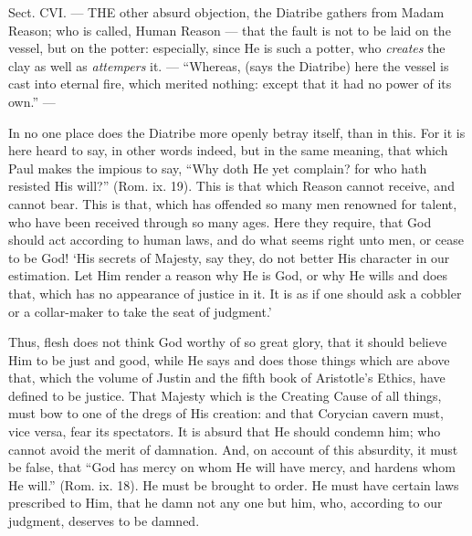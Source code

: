 
Sect. CVI. — THE other absurd objection, the Diatribe gathers from Madam Reason; who is called, Human Reason — that the fault is not to be laid on the vessel, but on the potter: especially, since He is such a potter, who \emph{creates }the clay as well as \emph{attempers }it. — “Whereas, (says the Diatribe) here the vessel is cast into eternal fire, which merited nothing: except that it had no power of its own.” —

In no one place does the Diatribe more openly betray itself, than in this. For it is here heard to say, in other words indeed, but in the same meaning, that which Paul makes the impious to say, “Why doth He yet complain? for who hath resisted His will?” (Rom. ix. 19). This is that which Reason cannot receive, and cannot bear. This is that, which has offended so many men renowned for talent, who have been received through so many ages. Here they require, that God should act according to human laws, and do what seems right unto men, or cease to be God! ‘His secrets of Majesty, say they, do not better His character in our estimation. Let Him render a reason why He is God, or why He wills and does that, which has no appearance of justice in it. It is as if one should ask a cobbler or a collar-maker to take the seat of judgment.’

Thus, flesh does not think God worthy of so great glory, that it should believe Him to be just and good, while He says and does those things which are above that, which the volume of Justin and the fifth book of Aristotle’s Ethics, have defined to be justice. That Majesty which is the Creating Cause of all things, must bow to one of the dregs of His creation: and that Corycian cavern must, vice versa, fear its spectators. It is absurd that He should condemn him; who cannot avoid the merit of damnation. And, on account of this absurdity, it must be false, that “God has mercy on whom He will have mercy, and hardens whom He will.” (Rom. ix. 18). He must be brought to order. He must have certain laws prescribed to Him, that he damn not any one but him, who, according to our judgment, deserves to be damned.

